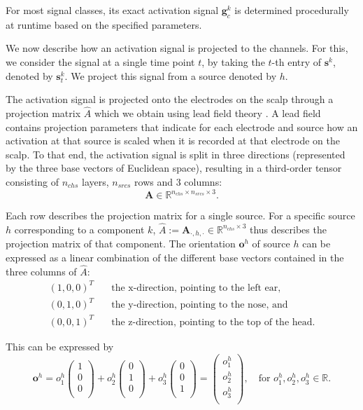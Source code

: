 For most signal classes, its exact activation signal $\bm{g}^{k}_{c}$ is determined procedurally at runtime based on the specified parameters.

We now describe how an activation signal is projected to the channels. For this, we consider the signal at a single time point $t$, by taking the $t$-th entry of $\bm{s}^k$, denoted by $\bm{s}^k_{t}$. We project this signal from a source denoted by $h$.

The activation signal is projected onto the electrodes on the scalp through a projection matrix $\hat{A}$ which we obtain using lead field theory \cite{ferree2000leadfield}. A lead field contains projection parameters that indicate for each electrode and source how an activation at that source is scaled when it is recorded at that electrode on the scalp. To that end, the activation signal is split in three directions (represented by the three base vectors of Euclidean space), resulting in a third-order tensor consisting of $n_{chs}$ layers, $n_{srcs}$ rows and $3$ columns:
\[\bm{A}\in \mathbb{R}^{n_{chs}\times n_{srcs}\times 3}.\]

Each row describes the projection matrix for a single source. For a specific source $h$ corresponding to a component $k$, $\hat{A}:=\bm{A}_{\cdot, h, \cdot}\in \mathbb{R}^{n_{chs}\times 3}$ thus describes the projection matrix of that component. The orientation $\bm{o}^h$ of source $h$ can be expressed as a linear combination of the different base vectors contained in the three columns of $\hat{A}$:
\begin{align*}
	\left(1, 0, 0\right)^T & \quad \text{the x-direction, pointing to the left ear, }\\
	\left(0, 1, 0\right)^T & \quad \text{the y-direction, pointing to the nose, and} \\
	\left(0, 0, 1\right)^T & \quad \text{the z-direction, pointing to the top of the head.}
\end{align*}

This can be expressed by 
\[ \bm{o}^h 
= o^h_1 \left( \begin{array}{c} 1\\ 0\\ 0\\ \end{array} \right) 
+ o^h_2 \left( \begin{array}{c} 0\\ 1\\ 0\\ \end{array} \right) 
+ o^h_3 \left( \begin{array}{c} 0\\ 0\\ 1\\ \end{array} \right) 
= \left( \begin{array}{c} o^h_1\\ o^h_2\\ o^h_3\\ \end{array} \right), \quad \text{for } o^h_1, o^h_2, o^h_3 \in \mathbb{R}.\]

